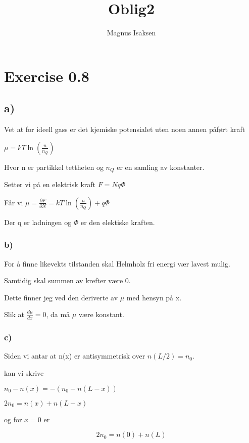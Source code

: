 \documentclass[12pt]{article}
\begin{document}
\title{Oblig2}
\author{Magnus Isaksen}
\maketitle
\section*{Exercise 0.8}

\subsection*{a)}

Vet at for ideell gass er det kjemiske potensialet uten noen annen påført kraft

$\mu = kT \ln(\frac{n}{n_Q})$ 

Hvor n er partikkel tettheten og $n_Q$ er en samling av konstanter. 

Setter vi på en elektrisk kraft $F = Nq\Phi$

Får vi $\mu = \frac{\partial F}{\partial N} = kT \ln(\frac{n}{n_Q}) + q\Phi$

Der q er ladningen og $\Phi$ er den elektiske kraften. 


\subsubsection*{b)}

For å finne likevekts tilstanden skal Helmholz fri energi vær lavest mulig.

Samtidig skal summen av krefter være 0. 

Dette finner jeg ved den deriverte av $\mu$ med hensyn på x. 

Slik at $\frac{d\mu}{dx} = 0$, da må $\mu$ være konstant.

\subsubsection*{c)}

Siden vi antar at n(x) er antisymmetrisk over $n(L/2) = n_0$. 

kan vi skrive 

$n_0 -n(x) = -(n_0 - n(L-x))$

$2n_0 = n(x) + n(L-x)$

og for $x= 0$ er 

\begin{equation}
2 n_0 = n(0) +n(L)
\label{eq1}
\end{equation} 
\end{document}
